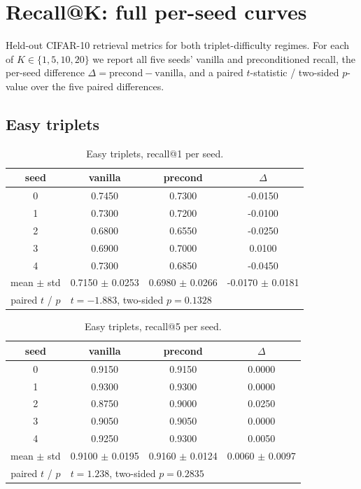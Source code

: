 \section{Recall@K: full per-seed curves}
\label{app:recall}

Held-out CIFAR-10 retrieval metrics for both triplet-difficulty regimes. For each of $K \in \{1, 5, 10, 20\}$ we report all five seeds' vanilla and preconditioned recall, the per-seed difference $\Delta = \text{precond} - \text{vanilla}$, and a paired $t$-statistic / two-sided $p$-value over the five paired differences.

\subsection{Easy triplets}
\begin{table}[H]
\centering
\caption{Easy triplets, recall@1 per seed.}
\label{tab:recall-easy-K1}
\begin{tabular}{c c c c}
\toprule
seed & vanilla & precond & $\Delta$ \\
\midrule
0 & 0.7450 & 0.7300 & -0.0150 \\
1 & 0.7300 & 0.7200 & -0.0100 \\
2 & 0.6800 & 0.6550 & -0.0250 \\
3 & 0.6900 & 0.7000 & 0.0100 \\
4 & 0.7300 & 0.6850 & -0.0450 \\
\midrule
mean $\pm$ std & 0.7150 $\pm$ 0.0253 & 0.6980 $\pm$ 0.0266 & -0.0170 $\pm$ 0.0181 \\
paired $t$ / $p$ & \multicolumn{3}{l}{$t = -1.883$, two-sided $p = 0.1328$} \\
\bottomrule
\end{tabular}
\end{table}

\begin{table}[H]
\centering
\caption{Easy triplets, recall@5 per seed.}
\label{tab:recall-easy-K5}
\begin{tabular}{c c c c}
\toprule
seed & vanilla & precond & $\Delta$ \\
\midrule
0 & 0.9150 & 0.9150 & 0.0000 \\
1 & 0.9300 & 0.9300 & 0.0000 \\
2 & 0.8750 & 0.9000 & 0.0250 \\
3 & 0.9050 & 0.9050 & 0.0000 \\
4 & 0.9250 & 0.9300 & 0.0050 \\
\midrule
mean $\pm$ std & 0.9100 $\pm$ 0.0195 & 0.9160 $\pm$ 0.0124 & 0.0060 $\pm$ 0.0097 \\
paired $t$ / $p$ & \multicolumn{3}{l}{$t = 1.238$, two-sided $p = 0.2835$} \\
\bottomrule
\end{tabular}
\end{table}

